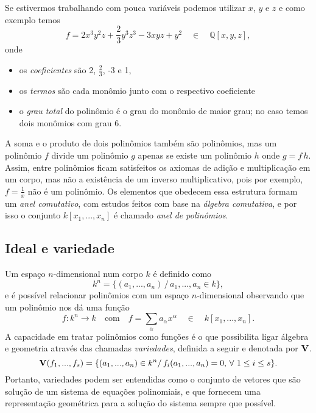 Se estivermos trabalhando com pouca variáveis podemos utilizar $x$, $y$ e $z$ e como exemplo temos
\begin{equation*}
f=2x^3y^2z+\frac{2}{3}y^3z^3-3xyz+y^2\quad\in\quad\mathbb{Q}[x,y,z],
\end{equation*} 
onde
\begin{itemize}
\item os {\it coeficientes} são 2, $\frac{2}{3}$, -3 e 1,
\item os {\it termos} são cada monômio junto com o respectivo coeficiente
\item o {\it grau total} do polinômio é o grau do monômio de maior grau; no caso temos dois monômios com grau 6.
\end{itemize}

A soma e o produto de dois polinômios também são polinômios, mas um polinômio $f$ divide um polinômio $g$ apenas se existe um polinômio $h$ onde $g=f\,h$. Assim, entre polinômios ficam satisfeitos os axiomas de adição e multiplicação em um corpo, mas não a existência de um inverso multiplicativo, pois por exemplo, $f=\frac{1}{x}$ não é um polinômio. Os elementos que obedecem essa estrutura formam um {\it anel comutativo}, com estudos feitos com base na {\it álgebra comutativa}, e por isso o conjunto $k[x_1,...,x_n]$ é chamado {\it anel de polinômios}.

\subsection{Ideal e variedade}
Um espaço $n$-dimensional num corpo $k$ é definido como
\begin{equation*}
k^n=\{(a_1,...,a_n)\,/\, a_1,...,a_n\in k\},
\end{equation*}
e é possível relacionar polinômios com um espaço $n$-dimensional observando que um polinômio nos dá uma função
\begin{equation*}
f:k^n\rightarrow k\quad\text{com}\quad f=\sum_\alpha a_\alpha x^\alpha\quad \in\quad k[x_1,...,x_n].
\end{equation*}
A capacidade em tratar polinômios como funções é o que possibilita ligar álgebra e geometria através das chamadas {\it variedades}, definida a seguir e denotada por ${\bf V}$.
\begin{equation*}
{\bf V}(f_1,...,f_s)=\{(a_1,...,a_n)\in k^n/\, f_i(a_1,...,a_n)=0, \,\forall\,\, 1\le i\le s\}.
\end{equation*}
Portanto, variedades podem ser entendidas como o conjunto de vetores que são solução de um sistema de equações polinomiais, e que fornecem uma representação geométrica para a solução do sistema sempre que possível.

